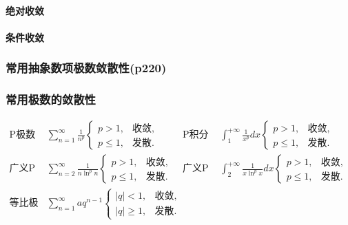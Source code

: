 ﻿\documentclass[a4paper,12pt,UTF8]{ctexart}
\begin{document}
    \paragraph{绝对收敛}

    \paragraph{条件收敛}

    \subsubsection{常用抽象数项极数敛散性(p220)}

    \subsubsection{常用极数的敛散性}
    \begin{align*}
        \text{P极数}\enspace& \sum_{n=1}^{\infty}\frac{1}{n^{p}}
        \begin{cases}
            p>1,&\text{收敛},\\
            p \leq 1,&\text{发散}.
        \end{cases}&
        \text{P积分}\enspace& \int_{1}^{+\infty}\frac{1}{x^{p}}dx
        \begin{cases}
            p>1,&\text{收敛},\\
            p \leq 1,&\text{发散}.
        \end{cases}&\\
        \text{广义P极数}\enspace& \sum_{n=2}^{\infty}\frac{1}{n \ln^p n}
        \begin{cases}
            p>1,&\text{收敛},\\
            p \leq 1,&\text{发散}.
        \end{cases}&
        \text{广义P积分}\enspace& \int_{2}^{+\infty}\frac{1}{x \ln^p x}dx
        \begin{cases}
            p>1,&\text{收敛},\\
            p \leq 1,&\text{发散}.
        \end{cases}&\\
        \text{等比极数}\enspace& \sum_{n=1}^{\infty}aq^{n-1}
        \begin{cases}
            |q|<1,&\text{收敛},\\
            |q| \geq 1,&\text{发散}.
        \end{cases}&\\
    \end{align*} 
\end{document}

